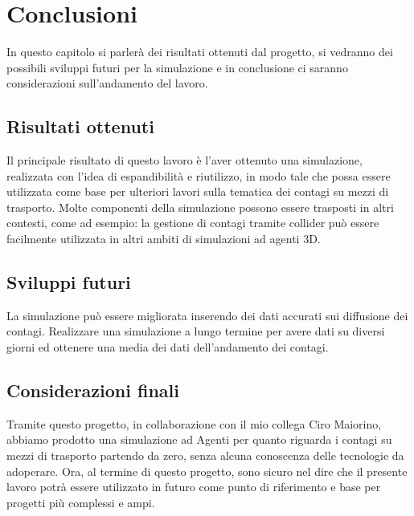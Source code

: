 \documentclass[12pt, openany]{book}
\begin{document}
\chapter{Conclusioni}
	In questo capitolo si parlerà dei risultati ottenuti dal progetto, si vedranno dei possibili sviluppi futuri per la simulazione e in conclusione ci saranno considerazioni sull'andamento del lavoro.
	\section{Risultati ottenuti}
	Il principale risultato di questo lavoro è l'aver ottenuto una simulazione, realizzata con l'idea di espandibilità e riutilizzo, in modo tale che possa essere utilizzata come base per ulteriori lavori sulla tematica dei contagi su mezzi di trasporto. Molte componenti della simulazione possono essere trasposti in altri contesti, come ad esempio: la gestione di contagi tramite collider può essere facilmente utilizzata in altri ambiti di simulazioni ad agenti 3D.
	\section{Sviluppi futuri}
	La simulazione può essere migliorata  inserendo dei dati accurati sui diffusione dei contagi. Realizzare una simulazione a lungo termine per avere dati su diversi giorni ed ottenere una media dei dati dell'andamento dei contagi.
	\section{Considerazioni finali}
	Tramite questo progetto, in collaborazione con il mio collega Ciro Maiorino, abbiamo prodotto una simulazione ad Agenti per quanto riguarda i contagi su mezzi di trasporto partendo da zero, senza alcuna conoscenza delle tecnologie da adoperare. Ora, al termine di questo progetto, sono sicuro nel dire che il presente lavoro potrà essere utilizzato in futuro come punto di riferimento e base per progetti più complessi e ampi.
\end{document}
